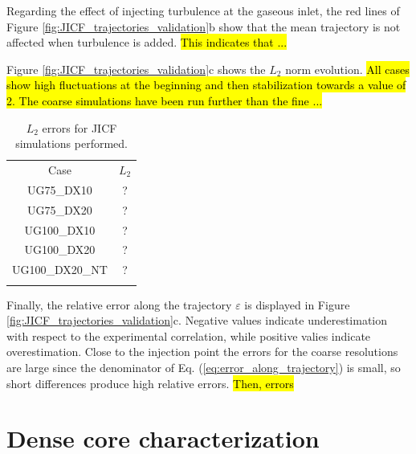 Regarding the effect of injecting turbulence at the gaseous inlet, the red lines of Figure \ref{fig:JICF_trajectories_validation}b show that the mean trajectory is not affected when turbulence is added. \hl{This indicates that ...}

Figure \ref{fig:JICF_trajectories_validation}c shows the $L_2$ norm evolution. \hl{All cases show high fluctuations at the beginning and then stabilization towards a value of 2. The coarse simulations have been run further than the fine ...}

\begin{table}[!h]
\centering
\caption{$L_2$ errors for JICF simulations performed.}
\begin{tabular}{cc}
\thickhline
Case &  $L_2$ \\
\thickhline 
UG75\_DX10 & ? \\
UG75\_DX20 & ?  \\
UG100\_DX10 & ? \\
UG100\_DX20 & ?  \\
UG100\_DX20\_NT & ? \\
\thickhline
\end{tabular}
\label{tab:jicf_L2_errors}
\end{table}



Finally, the relative error along the trajectory $\varepsilon$ is displayed in Figure \ref{fig:JICF_trajectories_validation}c. Negative values indicate underestimation with respect to the experimental correlation, while positive valies indicate overestimation. Close to the injection point the errors for the coarse resolutions are large since the denominator of Eq. (\ref{eq:error_along_trajectory}) is small, so short differences produce high relative errors. \hl{Then, errors }

%

\clearpage

\section{Dense core characterization}
\label{subsec:ch5_dense_core_in_ACLS_simus}



